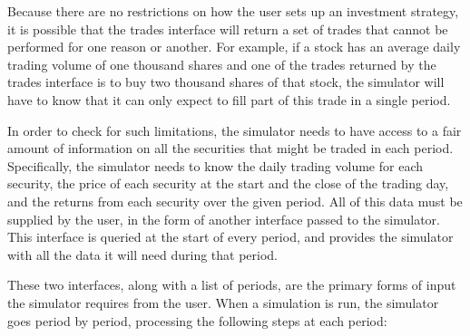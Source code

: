 \documentclass{article}
\begin{document}
Because there are no restrictions on how the user sets up an
investment strategy, it is possible that the trades interface will
return a set of trades that cannot be performed for one reason or
another.  For example, if a stock has an average daily trading volume
of one thousand shares and one of the trades returned by the trades
interface is to buy two thousand shares of that stock, the simulator
will have to know that it can only expect to fill part of this trade
in a single period.

In order to check for such limitations, the simulator needs to have
access to a fair amount of information on all the securities that
might be traded in each period.  Specifically, the simulator needs to
know the daily trading volume for each security, the price of each
security at the start and the close of the trading day, and the
returns from each security over the given period.  All of this data
must be supplied by the user, in the form of another interface passed
to the simulator.  This interface is queried at the start of every
period, and provides the simulator with all the data it will need
during that period.

These two interfaces, along with a list of periods, are the primary
forms of input the simulator requires from the user.  When a
simulation is run, the simulator goes period by period, processing the
following steps at each period:
\end{document}

